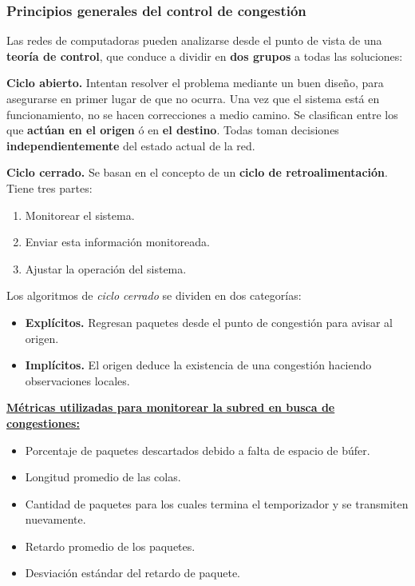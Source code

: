 \documentclass[10pt,a4paper]{article}
\begin{document}
\subsubsection{Principios generales del control de congestión}

Las redes de computadoras pueden analizarse desde el punto de vista de una \textbf{teoría de control}, que conduce a dividir en \textbf{dos grupos} a todas las soluciones: 

\begin{description}
\item \textbf{Ciclo abierto.} Intentan resolver el problema mediante un buen diseño, para asegurarse en primer lugar de que no ocurra. Una vez que el sistema está en funcionamiento, no se hacen correcciones a medio camino.
Se clasifican entre los que \textbf{actúan en el origen} ó en \textbf{el destino}. Todas toman decisiones \textbf{independientemente} del estado actual de la red.
\item \textbf{Ciclo cerrado.} Se basan en el concepto de un \textbf{ciclo de retroalimentación}. Tiene tres partes:
\begin{enumerate}
\item Monitorear el sistema.
\item Enviar esta información monitoreada.
\item Ajustar la operación del sistema.
\end{enumerate}
Los algoritmos de \textit{ciclo cerrado} se dividen en dos categorías:
\begin{itemize}
\item \textbf{Explícitos.} Regresan paquetes desde el punto de congestión para avisar al origen. 
\item \textbf{Implícitos.} El origen deduce la existencia de una congestión haciendo observaciones locales.
\end{itemize}
\end{description}
\vspace{10pt}
\underline{\textbf{Métricas utilizadas para monitorear la subred en busca de congestiones:}}
\begin{itemize}
\item Porcentaje de paquetes descartados debido a falta de espacio de búfer.
\item Longitud promedio de las colas.
\item Cantidad de paquetes para los cuales termina el temporizador y se transmiten nuevamente.
\item Retardo promedio de los paquetes.
\item Desviación estándar del retardo de paquete.
\end{itemize}
\end{document}
